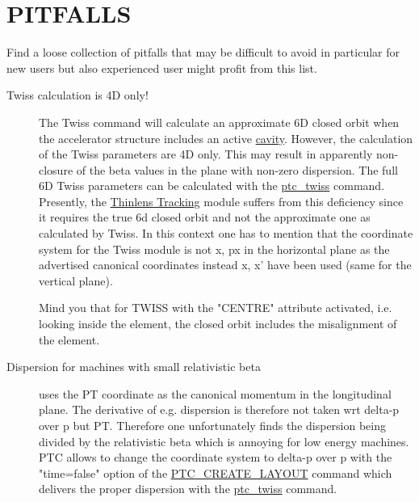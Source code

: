 
\chapter{\madx PITFALLS}

Find a loose collection of pitfalls that may be difficult to avoid in
particular for new users but also experienced user might profit from
this list.  


\begin{description}

\item[Twiss calculation is 4D only!]
  The Twiss command will calculate an approximate 6D closed orbit when
  the accelerator structure includes an active
  \href{../Introduction/cavity.html}{cavity}. However, the calculation
  of the Twiss parameters are 4D only. This may result in apparently
  non-closure of the beta values in the plane with non-zero
  dispersion. The full 6D Twiss parameters can be calculated with the
  \href{../ptc_twiss/ptc_twiss.html}{ptc\_twiss} command. Presently,
  the \href{../thintrack/thintrack.html}{Thinlens Tracking} module
  suffers from this deficiency since it requires the true 6d closed
  orbit and not the approximate one as calculated by Twiss. In this
  context one has to mention that the coordinate system for the Twiss
  module is not x, px in the horizontal plane as the advertised
  canonical coordinates instead x, x' have been used (same for the
  vertical plane).  
  
  Mind you that for TWISS with the "CENTRE" attribute activated,
  i.e. looking     inside the element, the closed orbit includes the
  misalignment of the element.  


  
\item[Dispersion for machines with small relativistic beta] 
  \madx uses the PT coordinate as the canonical momentum in the
  longitudinal plane. The derivative of e.g. dispersion is therefore
  not taken wrt delta-p over p but PT. Therefore one unfortunately finds the
  dispersion being divided by the relativistic beta which is annoying
  for low energy machines. PTC allows to change the coordinate system
  to  delta-p over p with the "time=false" option of the
  \href{../ptc_general/ptc_general.html#PTC_CREATE_LAYOUT}{PTC\_CREATE\_LAYOUT}
  command which delivers the proper dispersion with the
  \href{../ptc_twiss/ptc_twiss.html}{ptc\_twiss} command.  




\end{description}
